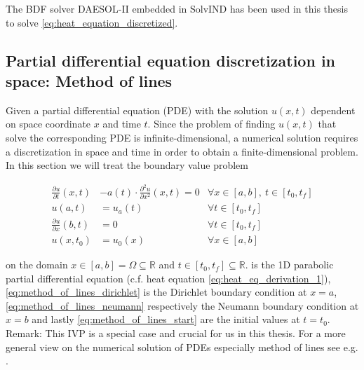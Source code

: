 \documentclass{scrartcl}[12pt, halfparskip]
\numberwithin{equation}{section}
\numberwithin{figure}{section}
\numberwithin{table}{section}
\begin{document}
The BDF solver DAESOL-II embedded in SolvIND has been used in this thesis to solve \cref{eq:heat_equation_discretized}.






\subsection{Partial differential equation discretization in space: Method of lines}
\label{sec:pde_discretization}


Given a partial differential equation (PDE) with the solution $u(x,t)$ dependent on space coordinate $x$ and time $t$. Since the problem of finding $u(x,t)$ that solve the corresponding PDE is infinite-dimensional, a numerical solution requires a discretization in space and time in order to obtain a finite-dimensional problem. \\
In this section we will treat the boundary value problem

\begin{subequations}
	\begin{align}
	\frac{\partial u}{\partial t}(x,t) & - a(t) \cdot \frac{\partial^2 u}{\partial x^2}(x,t) = 0 & \forall x \in [a,b], \ t \in [t_0,t_f] \label{eq:method_of_lines_pde} \\
	u(a,t) & = u_a(t)  & \forall t \in [t_0,t_f] \label{eq:method_of_lines_dirichlet} \\
	\frac{\partial u}{\partial x}(b,t) & = 0  & \forall t \in [t_0,t_f] \label{eq:method_of_lines_neumann}  \\
	u(x,t_0) & = u_0(x) & \forall x \in [a,b] \label{eq:method_of_lines_start}
	\end{align}
\end{subequations}

on the domain $x \in [a,b] = \Omega \subseteq \mathbb{R}$ and $t \in [t_0,t_f] \subseteq \mathbb{R}$.  is the 1D parabolic partial differential equation (c.f. heat equation \eqref{eq:heat_eq_derivation_1}), \cref{eq:method_of_lines_dirichlet} is the Dirichlet boundary condition at $x=a$, \cref{eq:method_of_lines_neumann} respectively the Neumann boundary condition at $x=b$ and lastly \cref{eq:method_of_lines_start} are the initial values at ${t=t_0}$. \\
Remark: This IVP is a special case and crucial for us in this thesis. For a more general view on the numerical solution of PDEs especially method of lines see e.g. \cite{pde_buch_solin}. \\
\end{document}
